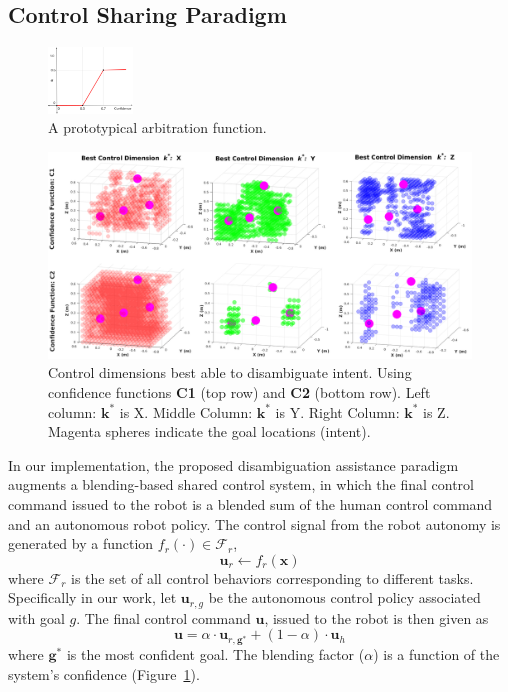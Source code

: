 \documentclass[conference]{IEEEtran}
\begin{document}
\subsection{Control Sharing Paradigm}\label{BP}
\begin{figure}
	\begin{center}
		\vspace{-0.9cm}
		\includegraphics[width=0.2\textwidth]{./figures/ArbFunc.png}
	\end{center}
	\vspace{-.3cm}
	\caption{A prototypical arbitration function.}
	\label{ALPHA}
\end{figure}
\begin{figure}[ht]
	\centering
	\includegraphics[width = 1\hsize, height = 0.35\vsize]{./figures/POINT_CLOUD.png}
	\caption{Control dimensions best able to disambiguate intent. Using confidence functions \textbf{C1} (top row) and \textbf{C2} (bottom row). Left column: $\boldsymbol{k}^*$ is X. Middle Column: $\boldsymbol{k}^*$ is Y. Right Column: $\boldsymbol{k}^*$ is Z. Magenta spheres indicate the goal locations (intent).}
	\label{HM_SEP}
\end{figure}
In our implementation, the proposed disambiguation assistance paradigm augments a blending-based shared control system, in which the final control command issued to the robot is a blended sum of the human control command and an autonomous robot policy. 
The control signal from the robot autonomy is generated by a function $f_{r}(\cdot) \in \mathcal{F}_{r}$, 
\begin{equation*}
\boldsymbol{u}_r \leftarrow f_{r}(\boldsymbol{x})
\end{equation*}
where $\mathcal{F}_{r}$ is the set of all control behaviors corresponding to different tasks.
Specifically in our work, let $\boldsymbol{u}_{r,g}$ be the autonomous control policy associated with goal $g$. The final control command $\boldsymbol{u}$, issued to the robot is then given as 
\begin{equation*}
\boldsymbol{u} = \alpha\cdot \boldsymbol{u}_{r,\boldsymbol{g}^*} + (1 - \alpha)\cdot \boldsymbol{u}_h
\end{equation*}
where $\boldsymbol{g}^*$ is the most confident goal. The blending factor ($\alpha$) is a function of the system's confidence (Figure~\ref{ALPHA}).
\end{document}
